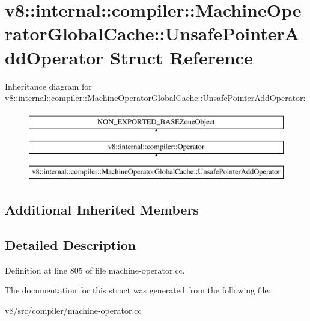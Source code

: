 \hypertarget{structv8_1_1internal_1_1compiler_1_1MachineOperatorGlobalCache_1_1UnsafePointerAddOperator}{}\section{v8\+:\+:internal\+:\+:compiler\+:\+:Machine\+Operator\+Global\+Cache\+:\+:Unsafe\+Pointer\+Add\+Operator Struct Reference}
\label{structv8_1_1internal_1_1compiler_1_1MachineOperatorGlobalCache_1_1UnsafePointerAddOperator}
Inheritance diagram for v8\+:\+:internal\+:\+:compiler\+:\+:Machine\+Operator\+Global\+Cache\+:\+:Unsafe\+Pointer\+Add\+Operator\+:\begin{figure}[H]
\begin{center}
\leavevmode
\includegraphics[height=3.000000cm]{structv8_1_1internal_1_1compiler_1_1MachineOperatorGlobalCache_1_1UnsafePointerAddOperator}
\end{center}
\end{figure}
\subsection*{Additional Inherited Members}


\subsection{Detailed Description}


Definition at line 805 of file machine-\/operator.\+cc.



The documentation for this struct was generated from the following file\+:\begin{DoxyCompactItemize}
\item 
v8/src/compiler/machine-\/operator.\+cc\end{DoxyCompactItemize}
